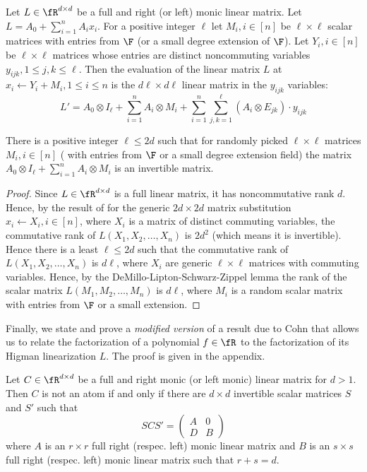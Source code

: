 



%
%
%
%
%
%
%
%
%
%
%
%
%
%
%
%
%
%
%
%
%
%
%
%
%
%
%
%
%
%
%
%
%
%

Let $L \in\fR^{d\times d}$ be a full and right (or left) monic linear matrix. Let
$L=A_0+\sum_{i=1}^n A_i x_i$. For a positive integer $\ell$ let $M_i,
i\in [n]$ be $\ell\times \ell$ scalar matrices with entries from $\F$
(or a small degree extension of $\F$). Let $Y_i, i\in [n]$ be
$\ell\times \ell$ matrices whose entries are distinct noncommuting
variables $y_{ijk}, 1\le j, k\le \ell$. Then the evaluation of the
linear matrix $L$ at $x_i\leftarrow Y_i+M_i, 1\le i\le n$ is the
$d\ell\times d\ell$ linear matrix in the $y_{ijk}$ variables:
\[
L' = A_0\otimes I_\ell + \sum_{i=1}^n A_i\otimes M_i +
\sum_{i=1}^n\sum_{j,k=1}^\ell (A_i\otimes E_{jk})\cdot y_{ijk}
\]

\begin{lemma}\label{shift-inv-lemma}
  There is a positive integer $\ell\le 2d$ such that for randomly
  picked $\ell \times \ell$ matrices $M_i, i\in[n]$ ( with entries
  from $\F$ or a small degree extension field) the matrix
  $A_0\otimes I_\ell + \sum_{i=1}^n A_i\otimes M_i$ is an
  invertible matrix.
\end{lemma}

\begin{proof}
Since $L\in\fR^{d\times d}$ is a full linear matrix, it has
noncommutative rank $d$. Hence, by the result of \cite{DM17} for the
generic $2d\times 2d$ matrix substitution $x_i \leftarrow X_i,
i\in[n]$, where $X_i$ is a matrix of distinct commuting variables, the
commutative rank of $L(X_1,X_2,\ldots,X_n)$ is $2d^2$ (which means it
is invertible). Hence there is a least $\ell\le 2d$ such that the
commutative rank of $L(X_1,X_2,\ldots,X_n)$ is $d\ell$, where $X_i$
are generic $\ell\times \ell$ matrices with commuting variables.
Hence, by the DeMillo-Lipton-Schwarz-Zippel lemma \cite{DL78,Sch80,Zip79} the
rank of the scalar matrix $L(M_1,M_2,\ldots,M_n)$ is $d\ell$, where
$M_i$ is a random scalar matrix with entries from $\F$ or a small
extension.
\end{proof}

Finally, we state and prove a \emph{modified version} of a result due
to Cohn that allows us to relate the factorization of a polynomial
$f\in\fR$ to the factorization of its Higman linearization $L$. The
proof is given in the appendix.

\begin{theorem}{\rm\cite[Theorem 5.8.8]{Cohnfir}}\label{cohnthm}
  Let $C\in\fR^{d\times d}$ be a full and right monic (or left monic)
  linear matrix for $d>1$. Then $C$ is not an atom if and only if
  there are $d\times d$ invertible scalar matrices $S$ and $S'$ such
  that
  \begin{equation}\label{eq-cohnthm}
  SCS' =
  \left(
\begin{array}{cc}
A & 0 \\
D & B
\end{array}
\right)
\end{equation}
where $A$ is an $r\times r$ full right (respec. left) monic linear matrix and $B$ is
an $s\times s$ full right (respec. left) monic linear matrix such that $r+s=d$.
\end{theorem}

